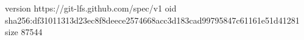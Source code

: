 version https://git-lfs.github.com/spec/v1
oid sha256:df31011313d23ec8f8deece2574668acc3d183cad99795847c61161e51d41281
size 87544
